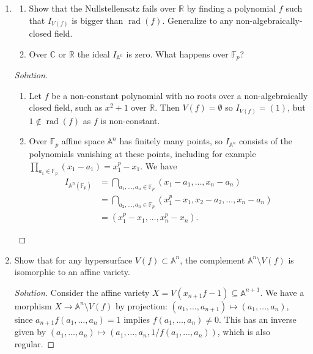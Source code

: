 \documentclass{article}
\theoremstyle{definition}
\DeclareMathOperator{\rad}{rad}
\newcommand{\F}{\mathbb{F}}
\newcommand{\A}{\mathbb{A}}
\newcommand{\R}{\mathbb{R}}
\newcommand{\C}{\mathbb{C}}
\begin{document}
\begin{enumerate}
    \item
        \begin{enumerate}[label=(\alph*)]
            \item Show that the Nullstellensatz fails over $\R$ by finding a
                polynomial $f$ such that $I_{V(f)}$ is bigger than $\rad(f)$.
                Generalize to any non-algebraically-closed field.

            \item Over $\C$ or $\R$ the ideal $I_{\A^n}$ is zero. What happens
                over $\F_p$?
        \end{enumerate}

        \begin{proof}[Solution]
            \begin{enumerate}[label=(\alph*)]
                \item Let $f$ be a non-constant polynomial with no roots over a
                    non-algebraically closed field, such as $x^2+1$ over $\R$.
                    Then $V(f)=\emptyset$ so $I_{V(f)}=(1)$, but
                    $1\notin\rad(f)$ as $f$ is non-constant.

                \item Over $\F_p$ affine space $\A^n$ has finitely many points,
                    so $I_{\A^n}$ consists of the polynomials vanishing at these
                    points, including for example
                    $\prod_{a_1\in\F_p}(x_1-a_1)=x_1^p-x_1$. We have
                    \begin{align*}
                        I_{\A^n(\F_p)}
                            &= \bigcap_{a_1,\ldots,a_n\in\F_p}
                                (x_1-a_1,\ldots,x_n-a_n) \\
                            &= \bigcap_{a_2,\ldots,a_n\in\F_p}
                                (x_1^p-x_1,x_2-a_2,\ldots,x_n-a_n) \\
                            &= (x_1^p-x_1,\ldots,x_n^p-x_n).
                    \end{align*}
            \end{enumerate}
        \end{proof}

    \item Show that for any hypersurface $V(f)\subset\A^n$, the complement
        $\A^n\setminus V(f)$ is isomorphic to an affine variety.

        \begin{proof}[Solution]
            Consider the affine variety $X=V(x_{n+1}f-1)\subseteq\A^{n+1}$. We
            have a morphism $X\to\A^n\setminus V(f)$ by projection:
            $(a_1,\ldots,a_{n+1})\mapsto(a_1,\ldots,a_n)$, since
            $a_{n+1}f(a_1,\ldots,a_n)=1$ implies $f(a_1,\ldots,a_n)\ne0$. This has
            an inverse given by
            $(a_1,\ldots,a_n)\mapsto(a_1,\ldots,a_n,1/f(a_1,\ldots,a_n))$, which is
            also regular.
        \end{proof}


\end{enumerate}
\end{document}
